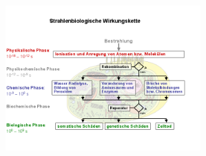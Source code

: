 \documentclass{beamer}
\begin{document}
\begin{frame}
    \begin{columns}
    \end{columns}
    \begin{block}{}
    \end{block}
\end{frame}

\begin{frame}{}
    \begin{center}
        \includegraphics[width=7.5cm]{img/Bild_7.png}\\
        \begin{block}{}
        \end{block}
    \end{center}
\end{frame}
\end{document}
